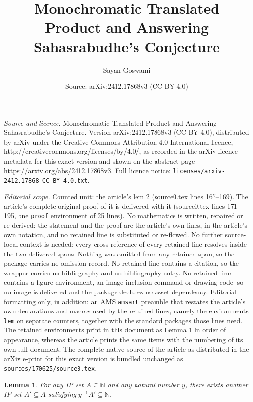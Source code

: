 \documentclass[10pt,a4paper]{amsart}
\title{Monochromatic Translated Product and Answering Sahasrabudhe's Conjecture}
\author{Sayan Goswami}
\date{Source: arXiv:2412.17868v3 (CC BY 4.0)}
\newtheorem{lem}{Lemma}
\begin{document}
\maketitle

\noindent\emph{Source and licence.} Monochromatic Translated Product and Answering Sahasrabudhe's Conjecture. Version arXiv:2412.17868v3 (CC BY 4.0), distributed by arXiv under the Creative Commons Attribution 4.0 International licence, http://creativecommons.org/licenses/by/4.0/, as recorded in the arXiv licence metadata for this exact version and shown on the abstract page https://arxiv.org/abs/2412.17868v3. Full licence notice: \texttt{licenses/arxiv-2412.17868-CC-BY-4.0.txt}.\par\smallskip

\noindent\textit{Editorial scope.} Counted unit: the article's lem 2 (source0.tex lines 167--169). The article's complete original proof of it is delivered with it (source0.tex lines 171--195, one \texttt{proof} environment of 25 lines). No mathematics is written, repaired or re-derived: the statement and the proof are the article's own lines, in the article's own notation, and no retained line is substituted or re-flowed.  No further source-local context is needed: every cross-reference of every retained line resolves inside the two delivered spans.  Nothing was omitted from any retained span, so the package carries no omission record.  No retained line contains a citation, so the wrapper carries no bibliography and no bibliography entry.  No retained line contains a figure environment, an image-inclusion command or drawing code, so no image is delivered and the package declares no asset dependency.  Editorial formatting only, in addition: an AMS \texttt{amsart} preamble that restates the article's own declarations and macros used by the retained lines, namely the environments \texttt{lem} on separate counters, together with the standard packages those lines need.  The retained environments print in this document as Lemma 1 in order of appearance, whereas the article prints the same items with the numbering of its own full document.  The complete native source of the article as distributed in the arXiv e-print for this exact version is bundled unchanged as \texttt{sources/170625/source0.tex}.
\begin{lem}\label{2}
For any IP set \( A \subseteq \mathbb{N} \) and any natural number \( y \), there exists another IP set \( A' \subseteq A \) satisfying \( y^{-1}A' \subseteq \mathbb{N} \).
\end{lem}
\end{document}
